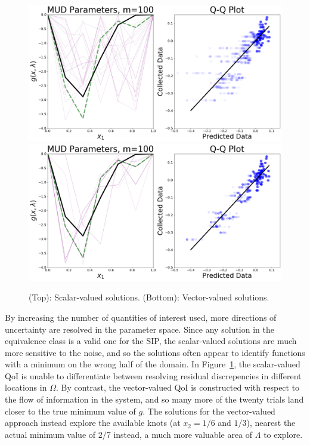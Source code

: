 \begin{figure}[htbp]
\centering
  \includegraphics[width=0.95\linewidth]{figures/pde-highd/pde-highd_pair_D5-1_m100}
  \includegraphics[width=0.95\linewidth]{figures/pde-highd/pde-highd_pair_D5-5_m100}
\caption{
(Top): Scalar-valued solutions.
(Bottom): Vector-valued solutions.
}
\label{fig:pde-highd-5d-mud}
\end{figure}

By increasing the number of quantities of interest used, more directions of uncertainty are resolved in the parameter space.
Since any solution in the equivalence class is a valid one for the SIP, the scalar-valued solutions are much more sensitive to the noise, and so the solutions often appear to identify functions with a minimum on the wrong half of the domain.
In Figure~\ref{fig:pde-highd-5d-mud}, the scalar-valued QoI is unable to differentiate between resolving residual discrepencies in different locations in $\Omega$.
By contrast, the vector-valued QoI is constructed with respect to the flow of information in the system, and so many more of the twenty trials land closer to the true minimum value of $g$.
The solutions for the vector-valued approach instead explore the available knots (at $x_2=1/6$ and $1/3$), nearest the actual minimum value of $2/7$ instead, a much more valuable area of $\Lambda$ to explore.

